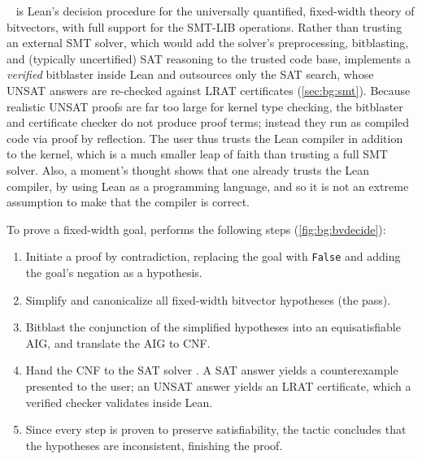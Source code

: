 \bvdecide{}~\citep{leanbv} is Lean's decision procedure for the universally
quantified, fixed-width theory of bitvectors, with full support for the
SMT-LIB \qfbv{} operations. Rather than trusting an external SMT solver,
which would add the solver's preprocessing, bitblasting, and (typically uncertified) SAT reasoning to the trusted code base,
\bvdecide{} implements a \emph{verified} bitblaster inside Lean and outsources only the SAT search,
whose UNSAT answers are re-checked against LRAT certificates (\cref{sec:bg:smt}).
Because realistic UNSAT proofs are far too large for kernel type checking,
the bitblaster and certificate checker do not produce proof terms; instead they run as compiled code via proof by reflection.
The user thus trusts the Lean compiler in addition to the kernel, which is a much smaller leap of faith than trusting a full SMT solver.
Also, a moment's thought shows that one already trusts the Lean compiler,
by using Lean as a programming language, and so it is not an extreme assumption to make that the compiler is correct.

To prove a fixed-width goal, \bvdecide{} performs the following steps
(\cref{fig:bg:bvdecide}):
\begin{enumerate}
  \item Initiate a proof by contradiction, replacing the goal with
  \texttt{False} and adding the goal's negation as a hypothesis.
  \item Simplify and canonicalize all fixed-width bitvector hypotheses
  (the \bvnormalize{} pass).
  \item Bitblast the conjunction of the simplified hypotheses into an
  equisatisfiable AIG, and translate the AIG to CNF.
  \item Hand the CNF to the SAT solver \cadical{}. A SAT answer yields a
  counterexample presented to the user; an UNSAT answer yields an LRAT
  certificate, which a verified checker validates inside Lean.
  \item Since every step is proven to preserve satisfiability, the tactic
  concludes that the hypotheses are inconsistent, finishing the proof.
\end{enumerate}


